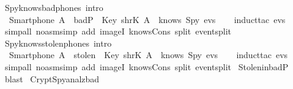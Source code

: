 \begin{isabellebody}
  \isanewline
  \isanewline
  \isanewline
  \isamarkupfalse%
  \ Spy{\isacharunderscore}knows{\isacharunderscore}bad{\isacharunderscore}phones\ {\isacharbrackleft}intro{\isacharbang}{\isacharbrackright}\ {\isacharcolon}\isanewline
  \ \ {\isachardoublequoteopen}Smartphone\ A\ {\isasymin}\ badP\ {\isasymLongrightarrow}\ Key\ {\isacharparenleft}shrK\ A{\isacharparenright}\ {\isasymin}\ knows\ Spy\ evs{\isachardoublequoteclose}\isanewline
  \isadelimproof
  \isanewline
  \ \ %
  \endisadelimproof
  \isatagproof
  \isamarkupfalse%
  \ {\isacharparenleft}induct{\isacharunderscore}tac\ {\isachardoublequoteopen}evs{\isachardoublequoteclose}{\isacharparenright}\isanewline
  \ \ \isamarkupfalse%
  \ {\isacharparenleft}simp{\isacharunderscore}all\ {\isacharparenleft}no{\isacharunderscore}asm{\isacharunderscore}simp{\isacharparenright}\ add{\isacharcolon}\ imageI\ knows{\isacharunderscore}Cons\ split{\isacharcolon}\ event{\isachardot}split{\isacharparenright}\isanewline
  \isamarkupfalse%
  \endisatagproof
  {\isafoldproof}%
  \isadelimproof
  \isanewline
  \endisadelimproof
  \isanewline
  \isanewline
  \isamarkupfalse%
  \ Spy{\isacharunderscore}knows{\isacharunderscore}stolen{\isacharunderscore}phones\ {\isacharbrackleft}intro{\isacharbang}{\isacharbrackright}\ {\isacharcolon}\isanewline
  \ \ {\isachardoublequoteopen}Smartphone\ A\ {\isasymin}\ stolen\ {\isasymLongrightarrow}\ Key\ {\isacharparenleft}shrK\ A{\isacharparenright}\ {\isasymin}\ knows\ Spy\ evs{\isachardoublequoteclose}\isanewline
  \isadelimproof
  \isanewline
  \ \ %
  \endisadelimproof
  \isatagproof
  \isamarkupfalse%
  \ {\isacharparenleft}induct{\isacharunderscore}tac\ {\isachardoublequoteopen}evs{\isachardoublequoteclose}{\isacharparenright}\isanewline
  \ \ \isamarkupfalse%
  \ {\isacharparenleft}simp{\isacharunderscore}all\ {\isacharparenleft}no{\isacharunderscore}asm{\isacharunderscore}simp{\isacharparenright}\ add{\isacharcolon}\ imageI\ knows{\isacharunderscore}Cons\ split{\isacharcolon}\ event{\isachardot}split{\isacharparenright}\isanewline
  \isamarkupfalse%
  \ Stolen{\isacharunderscore}in{\isacharunderscore}badP\ \isamarkupfalse%
  \ blast%
  \endisatagproof
  {\isafoldproof}%
  \isadelimproof
  \isanewline
  \endisadelimproof
  \isanewline
  \isanewline
  \isamarkupfalse%
  \ Crypt{\isacharunderscore}Spy{\isacharunderscore}analz{\isacharunderscore}bad\ {\isacharcolon}\isanewline

\end{isabellebody}
